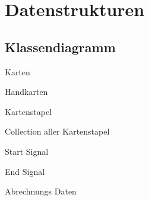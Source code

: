 \section{Datenstrukturen} 

\subsection{Klassendiagramm}


Karten

Handkarten

Kartenstapel

Collection aller Kartenstapel

Start Signal

End Signal

Abrechnungs Daten